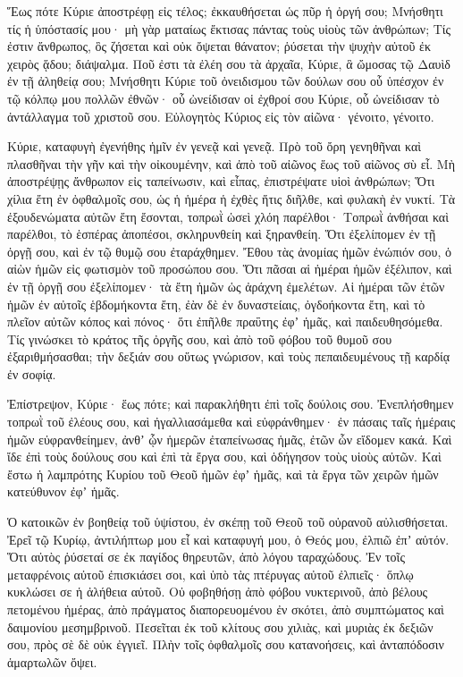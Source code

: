 \begin{spacing}{1.1}
\begin{multicols}{2}
Ἕως πότε Κύριε ἀποστρέφῃ εἰς τέλος; ἐκκαυθήσεται ὡς πῦρ ἡ ὀργή σου;
Μνήσθητι τίς ἡ ὑπόστασίς μου· μὴ γὰρ ματαίως ἔκτισας πάντας τοὺς υἱοὺς τῶν ἀνθρώπων;
Τίς ἐστιν ἄνθρωπος, ὃς ζήσεται καὶ οὐκ ὄψεται θάνατον; ῥύσεται τὴν ψυχὴν αὐτοῦ ἐκ χειρὸς ᾅδου; διάψαλμα.
Ποῦ ἐστι τὰ ἐλέη σου τὰ ἀρχαῖα, Κύριε, ἃ ὤμοσας τῷ Δαυὶδ ἐν τῇ ἀληθείᾳ σου;
Μνήσθητι Κύριε τοῦ ὀνειδισμου τῶν δούλων σου οὗ ὑπέσχον ἐν τῷ κόλπῳ μου πολλῶν ἐθνῶν·
οὗ ὠνείδισαν οἱ ἐχθροί σου Κύριε, οὗ ὠνείδισαν τὸ ἀντάλλαγμα τοῦ χριστοῦ σου.
Εὐλογητὸς Κύριος εἰς τὸν αἰῶνα· γένοιτο, γένοιτο.

Κύριε, καταφυγὴ ἐγενήθης ἡμῖν ἐν γενεᾷ καὶ γενεᾷ.
Πρὸ τοῦ ὄρη γενηθῆναι καὶ πλασθῆναι τὴν γῆν καὶ τὴν οἰκουμένην, καὶ ἀπὸ τοῦ αἰῶνος ἕως τοῦ αἰῶνος σὺ εἶ.
Μὴ ἀποστρέψῃς ἄνθρωπον εἰς ταπείνωσιν, καὶ εἶπας, ἐπιστρέψατε υἱοὶ ἀνθρώπων;
Ὅτι χίλια ἔτη ἐν ὀφθαλμοῖς σου, ὡς ἡ ἡμέρα ἡ ἐχθὲς ἥτις διῆλθε, καὶ φυλακὴ ἐν νυκτί.
Τὰ ἐξουδενώματα αὐτῶν ἔτη ἔσονται, τοπρωῒ ὡσεὶ χλόη παρέλθοι·
Τοπρωῒ ἀνθήσαι καὶ παρέλθοι, τὸ ἑσπέρας ἀποπέσοι, σκληρυνθείη καὶ ξηρανθείη.
Ὅτι ἐξελίπομεν ἐν τῇ ὀργῇ σου, καὶ ἐν τῷ θυμῷ σου ἐταράχθημεν.
Ἔθου τὰς ἀνομίας ἡμῶν ἐνώπιόν σου, ὁ αἰὼν ἡμῶν εἰς φωτισμὸν τοῦ προσώπου σου.
Ὅτι πᾶσαι αἱ ἡμέραι ἡμῶν ἐξέλιπον, καὶ ἐν τῇ ὀργῇ σου ἐξελίπομεν· τὰ ἔτη ἡμῶν ὡς ἀράχνη ἐμελέτων.
Αἱ ἡμέραι τῶν ἐτῶν ἡμῶν ἐν αὐτοῖς ἑβδομήκοντα ἔτη, ἐὰν δὲ ἐν δυναστείαις, ὀγδοήκοντα ἔτη, καὶ τὸ πλεῖον αὐτῶν κόπος καὶ πόνος· ὅτι ἐπῆλθε πραΰτης ἐφʼ ἡμᾶς, καὶ παιδευθησόμεθα.
Τίς γινώσκει τὸ κράτος τῆς ὀργῆς σου, καὶ ἀπὸ τοῦ φόβου τοῦ θυμοῦ σου ἐξαριθμήσασθαι;
τὴν δεξιάν σου οὕτως γνώρισον, καὶ τοὺς πεπαιδευμένους τῇ καρδίᾳ ἐν σοφίᾳ.

Ἐπίστρεψον, Κύριε· ἕως πότε; καὶ παρακλήθητι ἐπὶ τοῖς δούλοις σου.
Ἐνεπλήσθημεν τοπρωῒ τοῦ ἐλέους σου, καὶ ἠγαλλιασάμεθα καὶ εὐφράνθημεν· ἐν πάσαις ταῖς ἡμέραις ἡμῶν
εὐφρανθείημεν, ἀνθʼ ᾧν ἡμερῶν ἐταπείνωσας ἡμᾶς, ἐτῶν ὧν εἴδομεν κακά.
Καὶ ἴδε ἐπὶ τοὺς δούλους σου καὶ ἐπὶ τὰ ἔργα σου, καὶ ὁδήγησον τοὺς υἱοὺς αὐτῶν.
Καὶ ἔστω ἡ λαμπρότης Κυρίου τοῦ Θεοῦ ἡμῶν ἐφʼ ἡμᾶς, καὶ τὰ ἔργα τῶν χειρῶν ἡμῶν κατεύθυνον ἐφʼ ἡμᾶς.

Ὁ κατοικῶν ἐν βοηθείᾳ τοῦ ὑψίστου, ἐν σκέπῃ τοῦ Θεοῦ τοῦ οὐρανοῦ αὐλισθήσεται.
Ἐρεῖ τῷ Κυρίῳ, ἀντιλήπτωρ μου εἶ καὶ καταφυγή μου, ὁ Θεός μου, ἐλπιῶ ἐπʼ αὐτόν.
Ὅτι αὐτὸς ῥύσεταί σε ἐκ παγίδος θηρευτῶν, ἀπὸ λόγου ταραχώδους.
Ἐν τοῖς μεταφρένοις αὐτοῦ ἐπισκιάσει σοι, καὶ ὑπὸ τὰς πτέρυγας αὐτοῦ ἐλπιεῖς· ὅπλῳ κυκλώσει σε ἡ ἀλήθεια αὐτοῦ.
Οὐ φοβηθήσῃ ἀπὸ φόβου νυκτερινοῦ, ἀπὸ βέλους πετομένου ἡμέρας,
ἀπὸ πράγματος διαπορευομένου ἐν σκότει, ἀπὸ συμπτώματος καὶ δαιμονίου μεσημβρινοῦ.
Πεσεῖται ἐκ τοῦ κλίτους σου χιλιὰς, καὶ μυριὰς ἐκ δεξιῶν σου, πρὸς σὲ δὲ οὐκ ἐγγιεῖ.
Πλὴν τοῖς ὀφθαλμοῖς σου κατανοήσεις, καὶ ἀνταπόδοσιν ἁμαρτωλῶν ὄψει.


\end{multicols}
\end{spacing}
